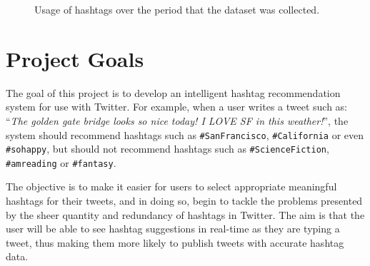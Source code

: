 \documentclass[11pt,a4paper]{report}
\begin{document}
\begin{figure}[htpb]
    \centering
    \caption{Usage of hashtags over the period that the dataset was collected.}
\end{figure}

\section{Project Goals}

The goal of this project is to develop an intelligent hashtag recommendation system for use with Twitter. For example, when a user writes a tweet such as: ``\emph{The golden gate bridge looks so nice today! I LOVE SF in this weather!}'', the system should recommend hashtags such as \texttt{\#SanFrancisco}, \texttt{\#California} or even \texttt{\#sohappy}, but should not recommend hashtags such as \texttt{\#ScienceFiction}, \texttt{\#amreading} or \texttt{\#fantasy}.

The objective is to make it easier for users to select appropriate meaningful hashtags for their tweets, and in doing so, begin to tackle the problems presented by the sheer quantity and redundancy of hashtags in Twitter. The aim is that the user will be able to see hashtag suggestions in real-time as they are typing a tweet, thus making them more likely to publish tweets with accurate hashtag data.
\end{document}

